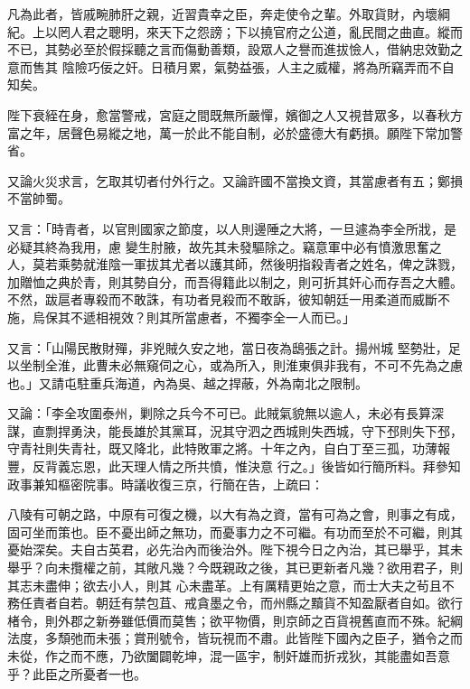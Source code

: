 \begin{pinyinscope}
 凡為此者，皆戚畹肺肝之親，近習貴幸之臣，奔走使令之輩。外取貨財，內壞綱紀。上以罔人君之聰明，來天下之怨謗；下以撓官府之公道，亂民間之曲直。縱而不已，其勢必至於假採聽之言而傷動善類，設眾人之譽而進拔憸人，借納忠效勤之意而售其
 陰險巧佞之奸。日積月累，氣勢益張，人主之威權，將為所竊弄而不自知矣。



 陛下衰絰在身，愈當警戒，宮庭之間既無所嚴憚，嬪御之人又視昔眾多，以春秋方富之年，居聲色易縱之地，萬一於此不能自制，必於盛德大有虧損。願陛下常加警省。



 又論火災求言，乞取其切者付外行之。又論許國不當換文資，其當慮者有五；鄭損不當帥蜀。



 又言：「時青者，以官則國家之節度，以人則邊陲之大將，一旦遽為李全所戕，是必疑其終為我用，慮
 變生肘腋，故先其未發驅除之。竊意軍中必有憤激思奮之人，莫若乘勢就淮陰一軍拔其尤者以護其師，然後明指殺青者之姓名，俾之誅戮，加贈恤之典於青，則其勢自分，而吾得籍此以制之，則可折其奸心而存吾之大體。不然，跋扈者專殺而不敢誅，有功者見殺而不敢訴，彼知朝廷一用柔道而威斷不施，烏保其不遞相視效？則其所當慮者，不獨李全一人而已。」



 又言：「山陽民散財殫，非兇賊久安之地，當日夜為鴟張之計。揚州城
 堅勢壯，足以坐制全淮，此曹未必無窺伺之心，或為所入，則淮東俱非我有，不可不先為之慮也。」又請屯駐重兵海道，內為吳、越之捍蔽，外為南北之限制。



 又論：「李全攻圍泰州，剿除之兵今不可已。此賊氣貌無以逾人，未必有長算深謀，直剽捍勇決，能長雄於其黨耳，況其守泗之西城則失西城，守下邳則失下邳，守青社則失青社，既又降北，此特敗軍之將。十年之內，自白丁至三孤，功薄報豐，反背義忘恩，此天理人情之所共憤，惟決意
 行之。」後皆如行簡所料。拜參知政事兼知樞密院事。時議收復三京，行簡在告，上疏曰：



 八陵有可朝之路，中原有可復之機，以大有為之資，當有可為之會，則事之有成，固可坐而策也。臣不憂出師之無功，而憂事力之不可繼。有功而至於不可繼，則其憂始深矣。夫自古英君，必先治內而後治外。陛下視今日之內治，其已舉乎，其未舉乎？向未攬權之前，其敞凡幾？今既親政之後，其已更新者凡幾？欲用君子，則其志未盡伸；欲去小人，則其
 心未盡革。上有厲精更始之意，而士大夫之茍且不務任責者自若。朝廷有禁包苴、戒貪墨之令，而州縣之黷貨不知盈厭者自如。欲行楮令，則外郡之新券雖低價而莫售；欲平物價，則京師之百貨視舊直而不殊。紀綱法度，多頹弛而未張；賞刑號令，皆玩視而不肅。此皆陛下國內之臣子，猶令之而未從，作之而不應，乃欲闔闢乾坤，混一區宇，制奸雄而折戎狄，其能盡如吾意乎？此臣之所憂者一也。




\end{pinyinscope}

